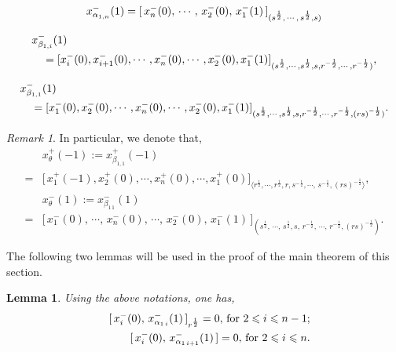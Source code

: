 \documentclass{amsproc}
\newtheorem{lemm}[theo]{Lemma}
\theoremstyle{remark}
\newtheorem{remark}[theo]{Remark}
\numberwithin{equation}{section}
\begin{document}
\begin{equation}
{\label{b:13}
\begin{split}
x_{\alpha_{1,n}}^-(1)=[\,x_n^-(0),\,\cdots,\,x_2^-(0),\,x_1^-(1)
\,]_{(s^{\frac{1}{2}},\,\cdots,\,s^{\frac{1}{2}}, s)}
\end{split}}
\end{equation}
\medskip

\begin{equation}
{\label{b:14}
\begin{split}
&x_{\beta_{1,i}}^-(1)\\
&\quad=[x_{i}^-(0), x_{i+1}^-(0), \cdots, x_{n}^-(0), \cdots, x_2^-(0), x_1^-(1)]_{(s^{\frac{1}{2}}, \cdots, s^{\frac{1}{2}}, s, r^{-\frac{1}{2}}, \cdots, r^{-\frac{1}{2}})},
\end{split}}
\end{equation}

\begin{equation}
{\label{b:15}
\begin{split}
&x_{\beta_{1,1}}^-(1)\\
&\quad=[x_{1}^-(0), x_{2}^-(0), \cdots, x_{n}^-(0), \cdots, x_2^-(0), x_1^-(1)]_{(s^{\frac{1}{2}}, \cdots, s^{\frac{1}{2}}, s, r^{-\frac{1}{2}}, \cdots, r^{-\frac{1}{2}}, (rs)^{-\frac{1}{2}})}.
\end{split}}
\end{equation}

\begin{remark} In particular, we denote that,
\begin{equation*}
\begin{split}
&x_{\theta}^+(-1):=x_{\beta_{1,1}}^+(-1)\\
=&\Big[\,x_1^+(-1), x_2^+(0), \cdots, x_{n}^+(0), \cdots, x_1^+(0)\Big]_{\langle r^{\frac{1}{2}}, \cdots, r^{\frac{1}{2}}, r,
s^{-\frac{1}{2}},\cdots,\,s^{-\frac{1}{2}},(rs)^{-\frac{1}{2}}\rangle} ,\\
&x_{\theta}^-(1):=x_{\beta_{1\,1}}^-(1)\\
=&\Big[\,x_1^-(0),\,\cdots,\,x_n^-(0),\,\cdots,\,x_2^-(0),\,x_1^-(1)
\,\Big]_{(s^{\frac{1}{2}},\,\cdots,\,s^{\frac{1}{2}},s,\,
r^{-\frac{1}{2}},\,\cdots,\,r^{-\frac{1}{2}},(rs)^{-\frac{1}{2}})}.
\end{split}
\end{equation*}
\end{remark}

The following two lemmas will be used in the proof of the main
theorem of this section.
\begin{lemm} Using the above notations, one has,
\begin{eqnarray}
&&{\label{b:16} [\,x_i^-{(0)},\, x_{\alpha_{1\,i}}^-(1)\,]_{r^{\frac{1}{2}}}=0, \, \hbox{for}\  2\leqslant i \leqslant n-1 ;}\\
&&{\label{b:17} [\,x_{i}^-{(0)},\, x_{\alpha_{1\,i+1}}^-(1)\,]=0, \, \hbox{for}\  2\leqslant i \leqslant n.}
\end{eqnarray}
\end{lemm}
\end{document}
